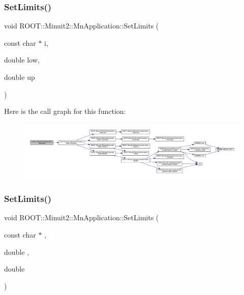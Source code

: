 \subsubsection{\texorpdfstring{SetLimits()}{SetLimits()}\hspace{0.1cm}{\footnotesize\ttfamily [3/4]}}
{\footnotesize\ttfamily void R\+O\+O\+T\+::\+Minuit2\+::\+Mn\+Application\+::\+Set\+Limits (\begin{DoxyParamCaption}\item[{const char $\ast$}]{i,  }\item[{double}]{low,  }\item[{double}]{up }\end{DoxyParamCaption})}

Here is the call graph for this function\+:\nopagebreak
\begin{figure}[H]
\begin{center}
\leavevmode
\includegraphics[width=350pt]{df/dd5/classROOT_1_1Minuit2_1_1MnApplication_a7c5404de0cf4efac550bea31f3cd4088_cgraph}
\end{center}
\end{figure}
\mbox{\label{classROOT_1_1Minuit2_1_1MnApplication_a7c5404de0cf4efac550bea31f3cd4088}} 
\subsubsection{\texorpdfstring{SetLimits()}{SetLimits()}\hspace{0.1cm}{\footnotesize\ttfamily [4/4]}}
{\footnotesize\ttfamily void R\+O\+O\+T\+::\+Minuit2\+::\+Mn\+Application\+::\+Set\+Limits (\begin{DoxyParamCaption}\item[{const char $\ast$}]{,  }\item[{double}]{,  }\item[{double}]{ }\end{DoxyParamCaption})}

